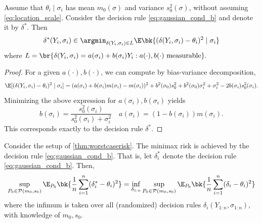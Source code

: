 \documentclass[12pt, reqno]{amsart}
\numberwithin{equation}{section}
\begin{document}
\begin{refsection}
\begin{appendices}
\begin{lemma}
\label{lemma:optimal_bayes_linear}
Assume that $
\theta_i \mid \sigma_i $ has mean $m_0(\sigma)$ and variance $s_0^2(\sigma)$, without
 assuming \eqref{eq:location_scale}. Consider the decision rule 
\eqref{eq:gaussian_cond_b} and denote it by $\delta^*$.
 Then \[
\delta^*(Y_i, \sigma_i) \in \argmin_{\delta(Y_i, \sigma_i) \in L} \E\bk{
  (\delta(Y_i, \sigma_i) - \theta_i )^2 \mid \sigma_i
}
\]
where $
L = \br{
  \delta(Y_i, \sigma_i) = a(\sigma_i) + b(\sigma_i) Y_i : a(\cdot), b(\cdot) \text{
  measurable}
}.
$
\end{lemma}
\begin{proof}
For a given $a(\cdot), b(\cdot)$, we can compute by bias-variance decomposition, \[
\E[(\delta(Y_i, \sigma_i) - \theta_i)^2 \mid \sigma_i] = (a(\sigma_i) + b(\sigma_i)m
(\sigma_i) - m
(\sigma_i))^2 + b^2(\sigma_0) s_0^2 + b^2(\sigma_0) \sigma_i^2 + \sigma_i^2 - 2b(\sigma_i)
s_0^2(\sigma_i).
\]
Minimizing the above expression for $a(\sigma_i), b(\sigma_i)$ yields \[
b(\sigma_i) = \frac{s_0^2(\sigma_i)}{s_0^2(\sigma_i) + \sigma_i^2} \quad a(\sigma_i) = 
(1-b(\sigma_i)) m(\sigma_i).
\]
This corresponds exactly to the decision rule $\delta^*$. 
\end{proof}

\begin{lemma}
\label{lemma:minimax_close_gauss}
Consider the setup of \cref{thm:worstcaserisk}. The minimax risk is achieved by the
decision rule \eqref{eq:gaussian_cond_b}. That is, let $\delta_i^*$ denote the decision
rule
\eqref{eq:gaussian_cond_b}. Then, \[
\sup_{P_0 \in \mathcal P(m_0, s_0)} \E_{P_0}\bk{
  \frac{1}{n} \sum_{i=1}^n (\delta_i^* - \theta_i)^2
}  = \inf_{\delta_{1:n}} \sup_{P_0 \in \mathcal P(m_0, s_0)} \E_{P_0}\bk{
  \frac{1}{n} \sum_{i=1}^n (\delta_i - \theta_i)^2
} 
\]
where the infimum is taken over all (randomized) decision rules $\delta_i(Y_{1:n},
\sigma_{1:n})$, with knowledge of $m_0, s_0$. 
\end{lemma} 


\end{appendices}
\end{refsection}
\end{document}
